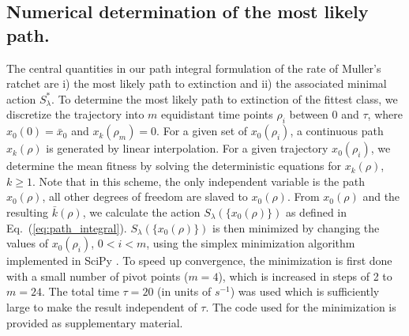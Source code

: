 \documentclass[rmp,preprint]{revtex4}
\newcommand{\EQ}[1]{Eq.~(\ref{eq:#1})}
\newcommand{\x}{x}
\newcommand{\xs}{\bar{\x}}
\newcommand{\mk}{\bar{k}}
\newcommand{\Smin}{S^*}
\begin{document}
\subsection*{Numerical determination of the most likely path.}
The central quantities in our path integral formulation of the rate of Muller's ratchet are i) the most likely path to extinction and ii) the associated minimal action $\Smin_{\lambda}$. 
To determine the most likely path to extinction of the fittest class, we discretize the trajectory into $m$ equidistant time points $\rho_i$ between $0$ and $\tau$, where $\x_0(0)=\xs_0$ and $\x_k(\rho_m)=0$.  For a given set of $\x_0(\rho_i)$, a continuous path $\x_k(\rho)$ is generated by linear interpolation. For a given trajectory $\x_0(\rho_i)$, we determine the mean fitness by solving the deterministic equations for $\x_k(\rho)$, $k\geq 1$. Note that in this scheme, the only independent variable is the path $\x_0(\rho)$, all other degrees of freedom are slaved to $\x_0(\rho)$. From $\x_0(\rho)$ and the resulting $\mk(\rho)$, we calculate the action $S_{\lambda}(\{\x_0(\rho)\})$ as defined in \EQ{path_integral}. $S_{\lambda}(\{\x_0(\rho)\})$ is then minimized by changing the values of $\x_0(\rho_i)$, $0<i<m$, using the simplex minimization algorithm implemented in SciPy \citep{Oliphant:2007p25672}. To speed up convergence, the minimization is first done with a small number of pivot points ($m=4$), which is increased in steps of 2 to $m=24$. The total time $\tau=20$ (in units of $s^{-1}$) was used which is sufficiently large to make the result independent of $\tau$. The code used for the minimization is provided as supplementary material.
\end{document}
